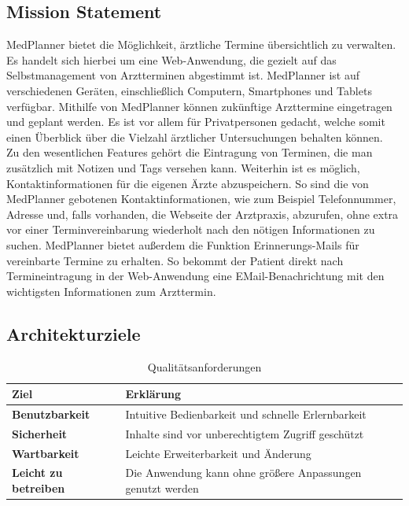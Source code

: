\documentclass[conference]{IEEEtran}
\begin{document}
\subsection{Mission Statement}
MedPlanner bietet die Möglichkeit, ärztliche Termine übersichtlich zu verwalten. Es handelt sich hierbei um eine Web-Anwendung, die gezielt auf das Selbstmanagement von Arztterminen abgestimmt ist. MedPlanner ist auf verschiedenen Geräten, einschließlich Computern, Smartphones und Tablets verfügbar. Mithilfe von MedPlanner können zukünftige Arzttermine eingetragen und geplant werden. Es ist vor allem für Privatpersonen gedacht, welche somit einen Überblick über die Vielzahl ärztlicher Untersuchungen behalten können.\\
Zu den wesentlichen Features gehört die Eintragung von Terminen, die man zusätzlich mit Notizen und Tags versehen kann. Weiterhin ist es möglich, Kontaktinformationen für die eigenen Ärzte abzuspeichern. So sind die von MedPlanner gebotenen Kontaktinformationen, wie zum Beispiel Telefonnummer, Adresse und, falls vorhanden, die Webseite der Arztpraxis, abzurufen, ohne extra vor einer Terminvereinbarung wiederholt nach den nötigen Informationen zu suchen. MedPlanner bietet außerdem die Funktion Erinnerungs-Mails für vereinbarte Termine zu erhalten. So bekommt der Patient direkt nach Termineintragung in der Web-Anwendung eine EMail-Benachrichtung mit den wichtigsten Informationen zum Arzttermin.


\subsection{Architekturziele}
\begin{table}[!h]
	\caption{Qualitätsanforderungen}
	\begin{tabularx}{\columnwidth}{>{\bfseries}l|p{57mm}}
		\toprule
		\textbf{Ziel} & Erklärung\\
		\midrule
		Benutzbarkeit & Intuitive Bedienbarkeit und schnelle Erlernbarkeit\\
		Sicherheit & Inhalte sind vor unberechtigtem Zugriff geschützt\\
		Wartbarkeit & Leichte Erweiterbarkeit und Änderung\\
		Leicht zu betreiben & Die Anwendung kann ohne größere Anpassungen genutzt werden\\
		\bottomrule
	\end{tabularx}
\end{table}
\end{document}
